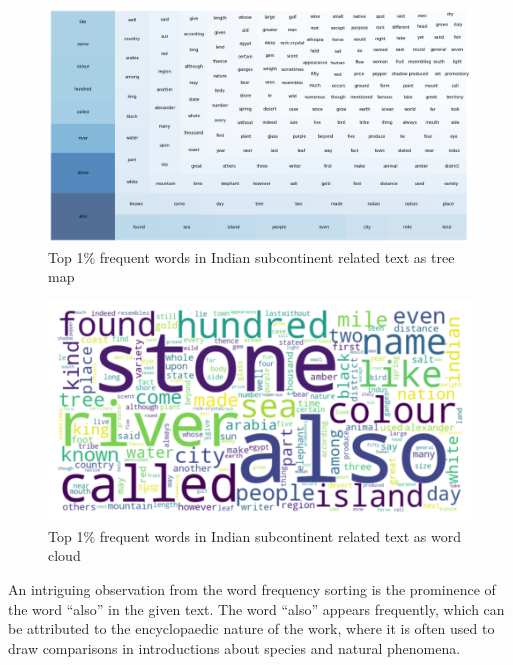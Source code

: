 \documentclass[
  12pt,
]{article}
\begin{document}
\begin{figure}

{\centering \includegraphics{NHthesis_structure_files/figure-pdf/fig-freqwords_treemap-output-1.png}

}

\caption{\label{fig-freqwords_treemap}Top 1\% frequent words in Indian
subcontinent related text as tree map}

\end{figure}

\begin{figure}

{\centering \includegraphics{NHthesis_structure_files/figure-pdf/fig-freqwords_wordcloud-output-1.png}

}

\caption{\label{fig-freqwords_wordcloud}Top 1\% frequent words in Indian
subcontinent related text as word cloud}

\end{figure}

An intriguing observation from the word frequency sorting is the
prominence of the word ``also'' in the given text. The word ``also''
appears frequently, which can be attributed to the encyclopaedic nature
of the work, where it is often used to draw comparisons in introductions
about species and natural phenomena.
\end{document}
